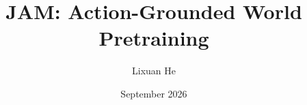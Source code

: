 \documentclass[10pt,letterpaper]{article}
\title{\vspace{-1.2em}\textbf{JAM: Action-Grounded World Pretraining}}
\author{Lixuan He}
\date{September 2026}
\begin{document}
\maketitle
\vspace{-1.5em}








\label{page:mainend}
\clearpage

{\fontsize{9}{10}\selectfont\setlength{\bibsep}{2pt}}
\clearpage

\end{document}
